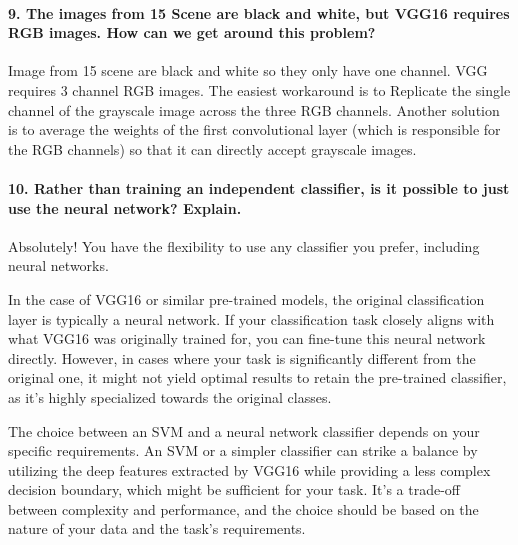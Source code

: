 \paragraph{9. The images from 15 Scene are black and white, but VGG16 requires RGB images. How can we get around this problem?}
Image from 15 scene are black and white so they only have one channel. VGG requires 3 channel RGB images. The easiest workaround is to Replicate the single channel of the grayscale image across the three RGB channels. Another solution is to average the weights of the first convolutional layer (which is responsible for the RGB channels) so that it can directly accept grayscale images.

\paragraph{10. Rather than training an independent classifier, is it possible to just use the neural network? Explain.}
Absolutely! You have the flexibility to use any classifier you prefer, including neural networks.

In the case of VGG16 or similar pre-trained models, the original classification layer is typically a neural network. If your classification task closely aligns with what VGG16 was originally trained for, you can fine-tune this neural network directly. However, in cases where your task is significantly different from the original one, it might not yield optimal results to retain the pre-trained classifier, as it's highly specialized towards the original classes.

The choice between an SVM and a neural network classifier depends on your specific requirements. An SVM or a simpler classifier can strike a balance by utilizing the deep features extracted by VGG16 while providing a less complex decision boundary, which might be sufficient for your task. It's a trade-off between complexity and performance, and the choice should be based on the nature of your data and the task's requirements.